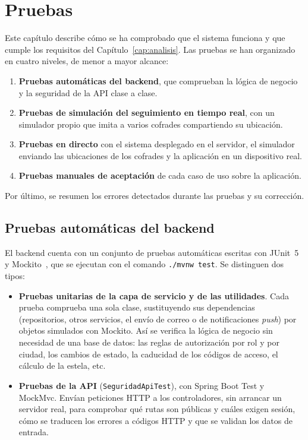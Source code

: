 \chapter{Pruebas}\label{cap:pruebas}

Este capítulo describe cómo se ha comprobado que el sistema funciona y que cumple los requisitos del Capítulo~\ref{cap:analisis}. Las pruebas se han organizado en cuatro niveles, de menor a mayor alcance:

\begin{enumerate}
    \item \textbf{Pruebas automáticas del backend}, que comprueban la lógica de negocio y la seguridad de la API clase a clase.
    \item \textbf{Pruebas de simulación del seguimiento en tiempo real}, con un simulador propio que imita a varios cofrades compartiendo su ubicación.
    \item \textbf{Pruebas en directo} con el sistema desplegado en el servidor, el simulador enviando las ubicaciones de los cofrades y la aplicación en un dispositivo real.
    \item \textbf{Pruebas manuales de aceptación} de cada caso de uso sobre la aplicación.
\end{enumerate}

Por último, se resumen los errores detectados durante las pruebas y su corrección.

\section{Pruebas automáticas del backend}\label{sec:pruebasBackend}

El backend cuenta con un conjunto de pruebas automáticas escritas con JUnit~5~\cite{junit} y Mockito~\cite{mockito}, que se ejecutan con el comando \texttt{./mvnw test}. Se distinguen dos tipos:

\begin{itemize}
    \item \textbf{Pruebas unitarias de la capa de servicio y de las utilidades}. Cada prueba comprueba una sola clase, sustituyendo sus dependencias (repositorios, otros servicios, el envío de correo o de notificaciones \emph{push}) por objetos simulados con Mockito. Así se verifica la lógica de negocio sin necesidad de una base de datos: las reglas de autorización por rol y por ciudad, los cambios de estado, la caducidad de los códigos de acceso, el cálculo de la estela, etc.
    \item \textbf{Pruebas de la API} (\texttt{SeguridadApiTest}), con Spring Boot Test y MockMvc. Envían peticiones HTTP a los controladores, sin arrancar un servidor real, para comprobar qué rutas son públicas y cuáles exigen sesión, cómo se traducen los errores a códigos HTTP y que se validan los datos de entrada.
\end{itemize}

